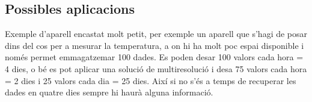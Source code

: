 












\subsection{Possibles aplicacions}

Exemple d'aparell encastat molt petit, per exemple un aparell que
s'hagi de posar dins del cos per a mesurar la temperatura, a on hi ha
molt poc espai disponible i només permet emmagatzemar 100 dades. Es
poden desar 100 valors cada hora = 4 dies, o bé es pot aplicar una
solució de multiresolució i desa 75 valors cada hora = 2 dies i 25
valors cada dia = 25 dies. Així si no s'és a temps de recuperar les
dades en quatre dies sempre hi haurà alguna informació.

